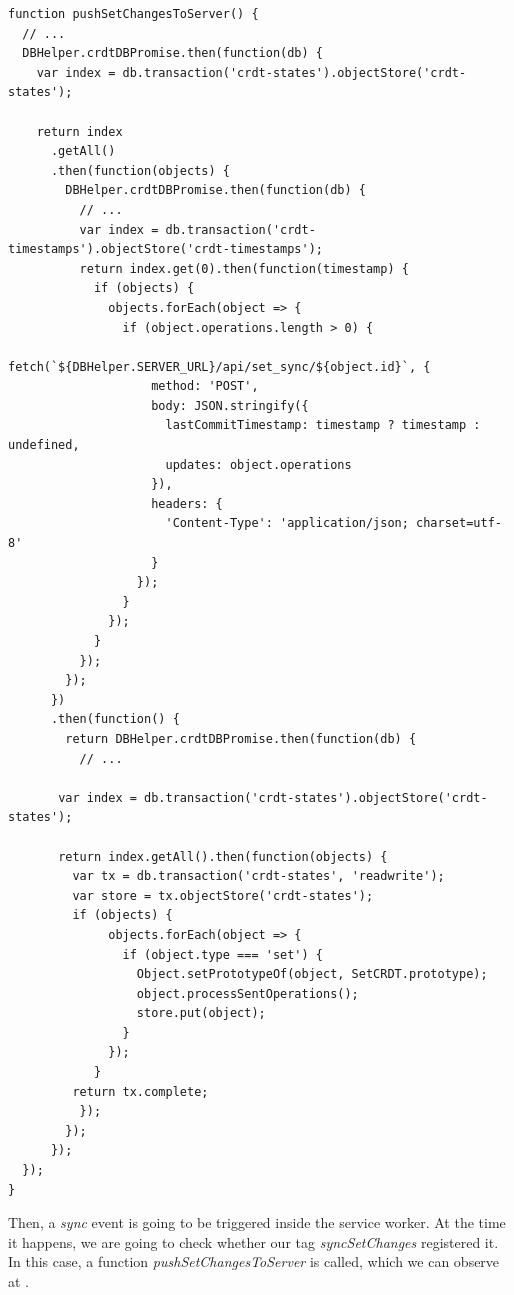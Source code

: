 \begin{lstlisting}[caption={[A function, which synchronises operations with the server when the connection is re-established]A function \textit{pushSetChangesToServer}, triggered whenever a client reconnects to the network.}, label={lst:dev12}]
function pushSetChangesToServer() {
  // ...
  DBHelper.crdtDBPromise.then(function(db) {
    var index = db.transaction('crdt-states').objectStore('crdt-states');

    return index
      .getAll()
      .then(function(objects) {
        DBHelper.crdtDBPromise.then(function(db) {
          // ...
          var index = db.transaction('crdt-timestamps').objectStore('crdt-timestamps');
          return index.get(0).then(function(timestamp) {
            if (objects) {
              objects.forEach(object => {
                if (object.operations.length > 0) {
                  fetch(`${DBHelper.SERVER_URL}/api/set_sync/${object.id}`, {
                    method: 'POST',
                    body: JSON.stringify({
                      lastCommitTimestamp: timestamp ? timestamp : undefined,
                      updates: object.operations
                    }),
                    headers: {
                      'Content-Type': 'application/json; charset=utf-8'
                    }
                  });
                }
              });
            }
          });
        });
      })
      .then(function() {
        return DBHelper.crdtDBPromise.then(function(db) {
          // ...

       var index = db.transaction('crdt-states').objectStore('crdt-states');

       return index.getAll().then(function(objects) {
         var tx = db.transaction('crdt-states', 'readwrite');
         var store = tx.objectStore('crdt-states');
         if (objects) {
              objects.forEach(object => {
                if (object.type === 'set') {
                  Object.setPrototypeOf(object, SetCRDT.prototype);
                  object.processSentOperations();
                  store.put(object);
                }
              });
            }
         return tx.complete;
          });
        });
      });
  });
}
\end{lstlisting}

Then, a \textit{sync} event is going to be triggered inside the service worker. At the time it happens, we are going to check whether our tag \textit{syncSetChanges} registered it. In this case, a function \textit{pushSetChangesToServer} is called, which we can observe at . 

